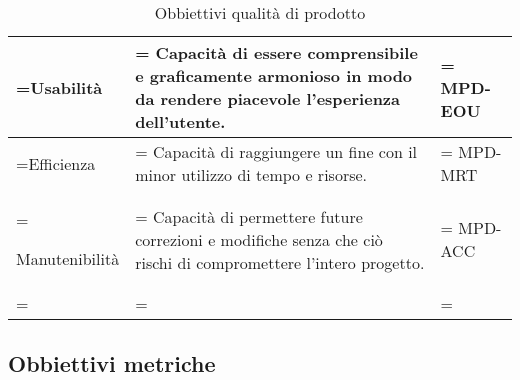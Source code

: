 \begin{xltabular}{\textwidth} {
        >{\hsize\linewidth=\hsize}X
        >{\hsize\linewidth=\hsize}X
        >{\hsize\linewidth=\hsize}X
    }
    Usabilità &
    Capacità di essere comprensibile e graficamente
    armonioso in modo da rendere piacevole l'esperienza
    dell'utente. &
    MPD-EOU
    \\ \hline

    Efficienza &
    Capacità di raggiungere un fine con il minor utilizzo di
    tempo e risorse. &
    MPD-MRT
    \\ \hline

    Manutenibilità &
    Capacità di permettere future correzioni e modifiche
    senza che ciò rischi di compromettere l'intero progetto. &
    MPD-ACC
    \\ \hline

    \caption{Obbiettivi qualità di prodotto}
\end{xltabular}



\subsection{Obbiettivi metriche}


